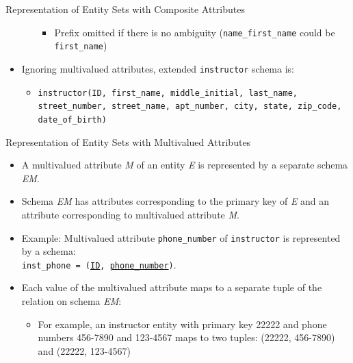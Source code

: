 \documentclass{beamer}
\begin{document}
\begin{frame}{Representation of Entity Sets with Composite Attributes}
\begin{minipage}{0.74\textwidth}
\begin{itemize}
\begin{itemize}
                \begin{itemize}
                    \scriptsize
                    \item Prefix omitted if there is no ambiguity (\texttt{name\_first\_name} could be \texttt{first\_name})
                \end{itemize}
            \end{itemize}
            \item Ignoring multivalued attributes, extended \texttt{instructor} schema is:
            \begin{itemize}
                \scriptsize
                \item \texttt{instructor(ID, first\_name, middle\_initial, last\_name, street\_number, street\_name, apt\_number, city, state, zip\_code, date\_of\_birth)}
            \end{itemize}
        \end{itemize}
    \end{minipage}
\end{frame}

\begin{frame}{Representation of Entity Sets with Multivalued Attributes}
    \begin{itemize}
        \item A multivalued attribute \textit{M} of an entity \textit{E} is represented by a separate schema \textit{EM}.
        \item Schema \textit{EM} has attributes corresponding to the primary key of \textit{E} and an attribute corresponding to multivalued attribute \textit{M}.
        \item Example: Multivalued attribute \texttt{phone\_number} of \texttt{instructor} is represented by a schema: \\
        \texttt{inst\_phone = (\underline{ID}, \underline{phone\_number})}.
        \item Each value of the multivalued attribute maps to a separate tuple of the relation on schema \textit{EM}:
        \begin{itemize}
            \item For example, an instructor entity with primary key 22222 and phone numbers 456-7890 and 123-4567 maps to two tuples: (22222, 456-7890) and (22222, 123-4567)
        \end{itemize}
    \end{itemize}
\end{frame}
\end{document}
